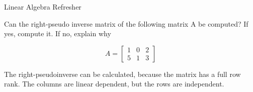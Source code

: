 \documentclass[
	english,
        solution=true
	]{tudaexercise}
\begin{document}
\begin{task}[points=28]{Linear Algebra Refresher}

\begin{subtask}[points=3,title=Matrix Pseudoinverse applied]

Can the right-pseudo inverse matrix of the following matrix A be computed? If yes, compute it. If no, explain why

\begin{equation*}
     A = 
     \begin{bmatrix}
     1 & 0 & 2 \\
     5 & 1 & 3 
     \end{bmatrix} 
\end{equation*}

\begin{solution}

The right-pseudoinverse can be calculated, because the matrix has a full row rank. The columns are linear dependent, but the rows are independent.\\



\end{solution}
\end{subtask}
\end{task}
\end{document}
